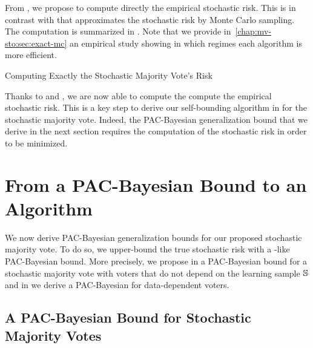 From , we propose to compute directly the empirical stochastic risk.
This is in contrast with  that approximates the stochastic risk by Monte Carlo sampling.
The computation is summarized in .
Note that we provide in~\ref{chap:mv-sto:sec:exact-mc} an empirical study showing in which regimes each algorithm is more efficient.

\begin{algorithm}[H]
 \caption{Computing Exactly the Stochastic Majority Vote's Risk}
  \begin{algorithmic}
    \EndFor
  \end{algorithmic}
  \label{chap:mv-sto:algo:exact}
\end{algorithm}

Thanks to  and , we are now able to compute the compute the empirical stochastic risk. 
This is a key step to derive our self-bounding algorithm in  for the stochastic majority vote.
Indeed, the PAC-Bayesian generalization bound that we derive in the next section requires the computation of the stochastic risk in order to be minimized.

\section{From a PAC-Bayesian Bound to an Algorithm}

We now derive PAC-Bayesian generalization bounds for our proposed stochastic majority vote.
To do so, we upper-bound the true stochastic risk with a \citeauthor{Seeger2002}-like PAC-Bayesian bound.
More precisely, we propose in  a PAC-Bayesian bound for a stochastic majority vote with voters that do not depend on the learning sample $\S$ and in  we derive a PAC-Bayesian for data-dependent voters.

\subsection{A PAC-Bayesian Bound for Stochastic Majority Votes}
\label{chap:mv-sto:sec:bound}

